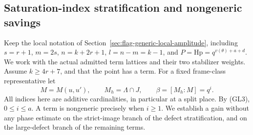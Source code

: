 \subsection{Saturation-index stratification and nongeneric savings}
\label{sec:flag-defect-stratification}

Keep the local notation of Section~\ref{sec:flag-generic-local-amplitude},
including \(s=r+1\), \(m=2s\), \(n=k+2r+1\), \(l=n-m=k-1\),
and \(P=\mathrm{Hp}=q^{v(\theta)+a+d}\). We work with the actual
admitted term lattices and their two stabilizer weights.
Assume \(k\ge4r+7\), and that the point has a term.
For a fixed frame-class representative let
\[
 M=M(u,u'),\qquad M_h=\Lambda\cap J,\qquad
 \beta=[M_h:M]=q^i.
\]
All indices here are additive cardinalities, in particular at a split
place. By (GL3), \(0\le i\le a\). A term is nongeneric precisely when
\(i\ge1\). We establish a gain without any phase estimate on the
strict-image branch of the defect stratification, and on the
large-defect branch of the remaining terms.

